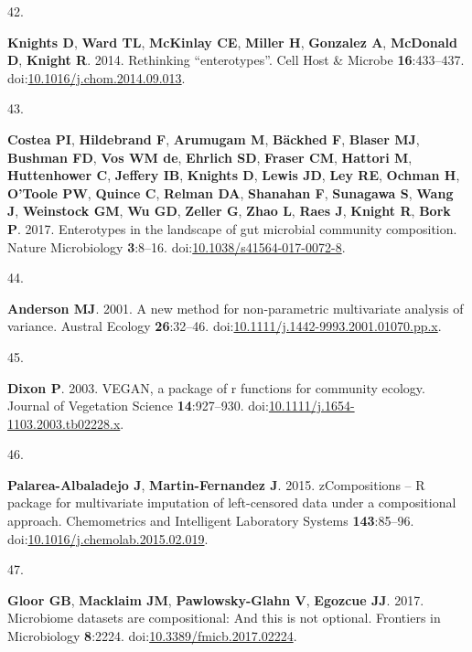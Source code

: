 \documentclass[
]{article}
\newlength{\cslhangindent}
\newlength{\csllabelwidth}
\newlength{\cslentryspacingunit} %
\newenvironment{CSLReferences}[2] %
 {%
  \setlength{\parindent}{0pt}
  \ifodd #1
  \let\oldpar\par
  \def\par{\hangindent=\cslhangindent\oldpar}
  \fi
  \setlength{\parskip}{#2\cslentryspacingunit}
 }%
 {}
\newcommand{\CSLLeftMargin}[1]{\parbox[t]{\csllabelwidth}{#1}}
\newcommand{\CSLRightInline}[1]{\parbox[t]{\linewidth - \csllabelwidth}{#1}\break}
\begin{document}
\begin{CSLReferences}{0}{1}
\leavevmode{}%
\CSLLeftMargin{42. }%
\CSLRightInline{\textbf{Knights D}, \textbf{Ward TL}, \textbf{McKinlay
CE}, \textbf{Miller H}, \textbf{Gonzalez A}, \textbf{McDonald D},
\textbf{Knight R}. 2014. Rethinking {``}enterotypes{''}. Cell Host {\&}
Microbe \textbf{16}:433--437.
doi:\href{https://doi.org/10.1016/j.chom.2014.09.013}{10.1016/j.chom.2014.09.013}.}

\leavevmode{}%
\CSLLeftMargin{43. }%
\CSLRightInline{\textbf{Costea PI}, \textbf{Hildebrand F},
\textbf{Arumugam M}, \textbf{Bäckhed F}, \textbf{Blaser MJ},
\textbf{Bushman FD}, \textbf{Vos WM de}, \textbf{Ehrlich SD},
\textbf{Fraser CM}, \textbf{Hattori M}, \textbf{Huttenhower C},
\textbf{Jeffery IB}, \textbf{Knights D}, \textbf{Lewis JD}, \textbf{Ley
RE}, \textbf{Ochman H}, \textbf{O'Toole PW}, \textbf{Quince C},
\textbf{Relman DA}, \textbf{Shanahan F}, \textbf{Sunagawa S},
\textbf{Wang J}, \textbf{Weinstock GM}, \textbf{Wu GD}, \textbf{Zeller
G}, \textbf{Zhao L}, \textbf{Raes J}, \textbf{Knight R}, \textbf{Bork
P}. 2017. Enterotypes in the landscape of gut microbial community
composition. Nature Microbiology \textbf{3}:8--16.
doi:\href{https://doi.org/10.1038/s41564-017-0072-8}{10.1038/s41564-017-0072-8}.}

\leavevmode{}%
\CSLLeftMargin{44. }%
\CSLRightInline{\textbf{Anderson MJ}. 2001. A new method for
non-parametric multivariate analysis of variance. Austral Ecology
\textbf{26}:32--46.
doi:\href{https://doi.org/10.1111/j.1442-9993.2001.01070.pp.x}{10.1111/j.1442-9993.2001.01070.pp.x}.}

\leavevmode{}%
\CSLLeftMargin{45. }%
\CSLRightInline{\textbf{Dixon P}. 2003. {VEGAN}, a package of r
functions for community ecology. Journal of Vegetation Science
\textbf{14}:927--930.
doi:\href{https://doi.org/10.1111/j.1654-1103.2003.tb02228.x}{10.1111/j.1654-1103.2003.tb02228.x}.}

\leavevmode{}%
\CSLLeftMargin{46. }%
\CSLRightInline{\textbf{Palarea-Albaladejo J}, \textbf{Martin-Fernandez
J}. 2015. zCompositions -- {R} package for multivariate imputation of
left-censored data under a compositional approach. Chemometrics and
Intelligent Laboratory Systems \textbf{143}:85--96.
doi:\href{https://doi.org/10.1016/j.chemolab.2015.02.019}{10.1016/j.chemolab.2015.02.019}.}

\leavevmode{}%
\CSLLeftMargin{47. }%
\CSLRightInline{\textbf{Gloor GB}, \textbf{Macklaim JM},
\textbf{Pawlowsky-Glahn V}, \textbf{Egozcue JJ}. 2017. Microbiome
datasets are compositional: And this is not optional. Frontiers in
Microbiology \textbf{8}:2224.
doi:\href{https://doi.org/10.3389/fmicb.2017.02224}{10.3389/fmicb.2017.02224}.}


\end{CSLReferences}
\end{document}
